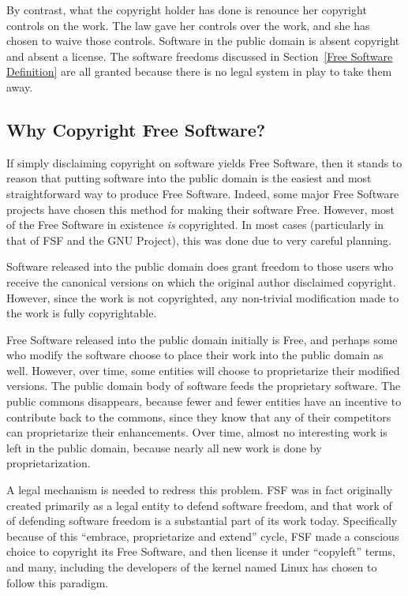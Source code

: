 \documentclass[12pt]{report}
\begin{document}
By contrast, what the copyright holder has done is renounce her copyright
controls on the work.  The law gave her controls over the work, and she
has chosen to waive those controls.  Software in the public domain is
absent copyright and absent a license.  The software freedoms discussed in
Section~\ref{Free Software Definition} are all granted because there is no
legal system in play to take them away.

\subsection{Why Copyright Free Software?}

If simply disclaiming copyright on software yields Free Software, then it
stands to reason that putting software into the public domain is the
easiest and most straightforward way to produce Free Software.  Indeed,
some major Free Software projects have chosen this method for making their
software Free.  However, most of the Free Software in existence \emph{is}
copyrighted.  In most cases (particularly in that of FSF and the GNU
Project), this was done due to very careful planning.

Software released into the public domain does grant freedom to those users
who receive the canonical versions on which the original author disclaimed
copyright.  However, since the work is not copyrighted, any non-trivial
modification made to the work is fully copyrightable.

Free Software released into the public domain initially is Free, and
perhaps some who modify the software choose to place their work into the
public domain as well.  However, over time, some entities will choose to
proprietarize their modified versions.  The public domain body of software
feeds the proprietary software.  The public commons disappears, because
fewer and fewer entities have an incentive to contribute back to the
commons, since they know that any of their competitors can proprietarize
their enhancements.  Over time, almost no interesting work is left in the
public domain, because nearly all new work is done by proprietarization.

A legal mechanism is needed to redress this problem.  FSF was in fact
originally created primarily as a legal entity to defend software freedom,
and that work of of defending software freedom is a substantial part of
its work today.  Specifically because of this ``embrace, proprietarize and
extend'' cycle, FSF made a conscious choice to copyright its Free Software,
and then license it under ``copyleft'' terms, and many, including the
developers of the kernel named Linux has chosen to follow this paradigm.
\end{document}
